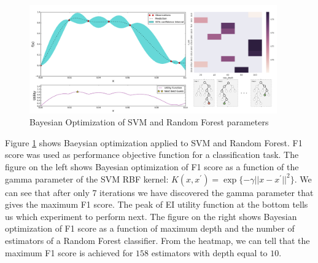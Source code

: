 \begin{figure}[tbhp]
    \centering
    \includegraphics[width=0.95\textwidth, trim={10 10 10 10}]{figures/bayes_opt.png}
    \caption{Bayesian Optimization of SVM and Random Forest parameters}
    \label{fig:bayes_opt}
\end{figure}

Figure \ref{fig:bayes_opt} shows Baeysian optimization applied to SVM and Random Forest. F1 score was used as performance objective function for a classification task. The figure on the left shows Bayesian optimization of F1 score as a function of the gamma parameter of the SVM RBF kernel: $K(x,x^{\prime}) = \exp\{-\gamma ||x-x^{\prime}||^{2}\}$. We can see that after only 7 iterations we have discovered the gamma parameter that gives the maximum F1 score. The peak of EI utility function at the bottom tells us which experiment to perform next. The figure on the right shows Bayesian optimization of F1 score as a function of maximum depth and the number of estimators of a Random Forest classifier. From the heatmap, we can tell that the maximum F1 score is achieved for $158$ estimators with depth equal to $10$.    















